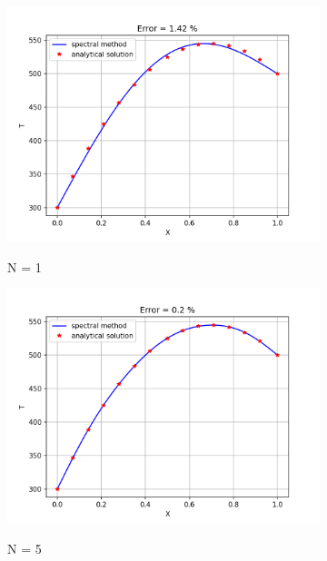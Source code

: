 \documentclass[conf]{new-aiaa}
\begin{document}
\begin{figure}[!htb]
    \centering
    \begin{subfigure}{0.45\textwidth}
        \includegraphics[width=\textwidth]{supportingFiles/output_N_1.png}
        \label{N_1}
        \caption{N = 1}
    \end{subfigure}
    \hfill
    \begin{subfigure}{0.45\textwidth}
        \includegraphics[width=\textwidth]{supportingFiles/output_N_5.png}
        \label{N_5}
        \caption{N = 5}
    \end{subfigure}
    \hfill
    \begin{subfigure}{0.45\textwidth}

\end{subfigure}
\end{figure}
\end{document}
